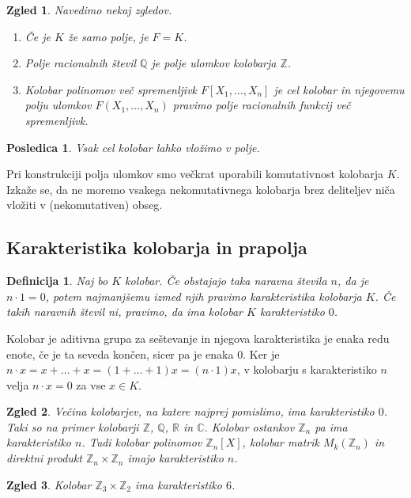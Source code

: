 \documentclass[10pt, a4paper]{article}
\newtheorem{posledica}[izr]{Posledica}
\newtheorem{defi}{Definicija}[section]
\newenvironment{noticeB}{%
  \tcolorbox[%
  notitle,
  empty,
  enhanced,  %
  breakable,
  coltext=black,
  colback=white, 
  fontupper=\rmfamily,
  parbox=false,
  noparskip,
  sharp corners,
  boxrule=-1pt,  %
  frame hidden,
  left=7pt,  %
  right=7pt,
  top=5pt,
  bottom=5pt,
  before skip=2.5ex plus 2pt,
  after skip=2.5ex plus 2pt,
  borderline west = {1.5pt}{-0.1pt}{blue!30!black}, %
  overlay unbroken and last={%
    \draw[color=black, line width=1.25pt]
    ($(frame.south west)+(1.pt, -0.1pt)$) -- ++(2em, 0);
  }
  ]}
{\endtcolorbox}
\newenvironment{definicija}{\begin{defi}\begin{noticeB}}{%
    \end{noticeB}\end{defi}}
\newtheorem{zgled}{Zgled}[section]
\newcommand{\Z}{\mathbb {Z}}
\newcommand{\Q}{\mathbb {Q}}
\newcommand{\R}{\mathbb {R}}
\newcommand{\C}{\mathbb {C}}
\begin{document}
\begin{zgled}
  Navedimo nekaj zgledov.
  \begin{enumerate}
    \item Če je $K$ že samo polje, je $F = K$.
    \item Polje racionalnih števil $\Q$ je polje ulomkov kolobarja $\Z$.
    \item Kolobar polinomov več spremenljivk $F[X_1, \dots, X_n]$ je cel kolobar in njegovemu polju ulomkov 
    $F(X_1, \dots, X_n)$ pravimo polje racionalnih funkcij več spremenljivk.
  \end{enumerate}
\end{zgled}

\begin{posledica}
  Vsak cel kolobar lahko vložimo v polje.
\end{posledica}

Pri konstrukciji polja ulomkov smo večkrat uporabili komutativnost kolobarja $K$.
Izkaže se, da ne moremo vsakega nekomutativnega kolobarja brez deliteljev niča vložiti v (nekomutativen)
obseg.

\subsection{Karakteristika kolobarja in prapolja}

\begin{definicija}
  Naj bo $K$ kolobar. Če obstajajo taka naravna števila $n$, da je $n \cdot 1 = 0$,
  potem najmanjšemu izmed njih pravimo karakteristika kolobarja $K$.
  Če takih naravnih števil ni, pravimo, da ima kolobar $K$ karakteristiko $0$.
\end{definicija}

Kolobar je aditivna grupa za seštevanje in njegova karakteristika je enaka redu enote,
če je ta seveda končen, sicer pa je enaka $0$.
Ker je $n \cdot x = x + \dots + x = (1 + \dots + 1)x = (n \cdot 1)x$,
v kolobarju s karakteristiko $n$ velja $n \cdot x = 0$ za vse $x \in K$.

\begin{zgled}
  Večina kolobarjev, na katere najprej pomislimo, ima karakteristiko 
  $0$. Taki so na primer kolobarji $\Z$, $\Q$, $\R$ in $\C$.
  Kolobar ostankov $\Z_n$ pa ima karakteristiko $n$.
  Tudi kolobar polinomov $\Z_n [X]$, kolobar matrik $M_k (\Z_n)$
  in direktni produkt $\Z_n \times \Z_n$ imajo karakteristiko $n$.
\end{zgled}

\begin{zgled}
  Kolobar $\Z_3 \times \Z_2$ ima karakteristiko $6$.
\end{zgled}
\end{document}
